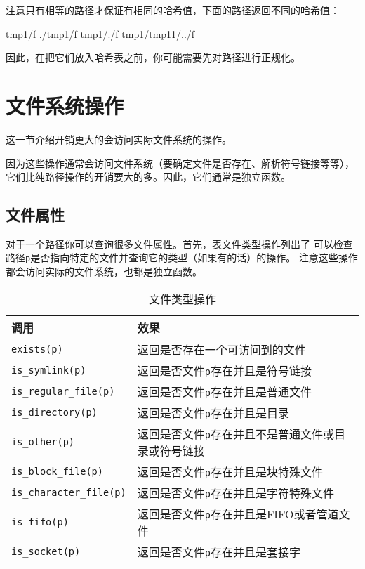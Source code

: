 注意只有\hyperref[ch20.3.6]{相等的路径}才保证有相同的哈希值，下面的路径返回不同的哈希值：
\begin{blacklisting}
    tmp1/f
    ./tmp1/f
    tmp1/./f
    tmp1/tmp11/../f
\end{blacklisting}
因此，在把它们放入哈希表之前，你可能需要先对路径进行正规化。


\section{文件系统操作}
这一节介绍开销更大的会访问实际文件系统的操作。

因为这些操作通常会访问文件系统（要确定文件是否存在、解析符号链接等等），
它们比纯路径操作的开销要大的多。因此，它们通常是独立函数。

\subsection{文件属性}\label{ch20.4.1}
对于一个路径你可以查询很多文件属性。首先，表\hyperref[t20.10]{文件类型操作}列出了
可以检查路径\texttt{p}是否指向特定的文件并查询它的类型（如果有的话）的操作。
注意这些操作都会访问实际的文件系统，也都是独立函数。
\begin{table}[htb]
    \centering
    \begin{tabular}{l|l}
        \hline
        \textbf{调用}                     & \textbf{效果}                        \\
        \hline
        \texttt{exists(p)}              & 返回是否存在一个可访问到的文件                    \\
        \texttt{is\_symlink(p)}         & 返回是否文件\texttt{p}存在并且是符号链接          \\
        \texttt{is\_regular\_file(p)}   & 返回是否文件\texttt{p}存在并且是普通文件          \\
        \texttt{is\_directory(p)}       & 返回是否文件\texttt{p}存在并且是目录            \\
        \texttt{is\_other(p)}           & 返回是否文件\texttt{p}存在并且不是普通文件或目录或符号链接 \\
        \texttt{is\_block\_file(p)}     & 返回是否文件\texttt{p}存在并且是块特殊文件         \\
        \texttt{is\_character\_file(p)} & 返回是否文件\texttt{p}存在并且是字符特殊文件        \\
        \texttt{is\_fifo(p)}            & 返回是否文件\texttt{p}存在并且是FIFO或者管道文件    \\
        \texttt{is\_socket(p)}          & 返回是否文件\texttt{p}存在并且是套接字           \\
        \hline
    \end{tabular}
    \caption{文件类型操作}
    \label{t20.10}
\end{table}


